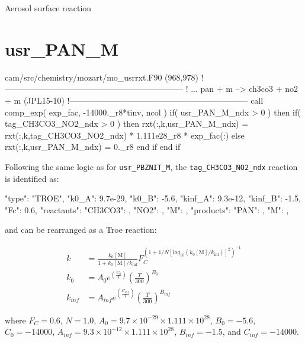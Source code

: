 \documentclass[titlepage]{article}
\begin{document}
Aerosol surface reaction


\section{usr\_PAN\_M}

\begin{blockcode}[commandchars=\\\{\}]
\color{gray}cam/src/chemistry/mozart/mo_usrrxt.F90 (968,978)
!-----------------------------------------------------------------
! ... pan + m --> ch3co3 + no2 + m (JPL15-10)
!-----------------------------------------------------------------
       call comp_exp( exp_fac, -14000._r8*tinv, ncol )
       if( usr_PAN_M_ndx > 0 ) then
          if( tag_CH3CO3_NO2_ndx > 0 ) then
             rxt(:,k,usr_PAN_M_ndx) = rxt(:,k,tag_CH3CO3_NO2_ndx) * 1.111e28_r8 * exp_fac(:)
          else
             rxt(:,k,usr_PAN_M_ndx) = 0._r8
          end if
       end if
\end{blockcode}

Following the same logic as for \verb>usr_PBZNIT_M>, the \verb>tag_CH3CO3_NO2_ndx> reaction is identified as:

\begin{blockcode}
         {
          "type": "TROE",
          "k0_A": 9.7e-29,
          "k0_B": -5.6,
          "kinf_A": 9.3e-12,
          "kinf_B": -1.5,
          "Fc": 0.6,
          "reactants": {
            "CH3CO3": { },
            "NO2": { },
            "M": { }
          },
          "products": {
            "PAN": { },
            "M": { }
          }
        },
\end{blockcode}

\noindent and can be rearranged as a Troe reaction:

\begin{equation}
\begin{split}
k & = \frac{k_0[\mbox{M}]}{1+k_0[\mbox{M}]/k_{\inf}}F_C^{(1+1/N[log_{10}(k_0[\mbox{M}]/k_{\inf})]^2)^{-1}} \\
k_0 & = A_0 e^{\left( \frac{C_0}{T} \right)} \left( \frac{T}{300} \right)^{B_0} \\
k_{inf} & = A_{inf} e^{\left( \frac{C_{inf}}{T} \right)} \left( \frac{T}{300} \right)^{B_{inf}}
\end{split}
\end{equation}

\noindent where $F_C = 0.6$, $N = 1.0$, $A_0 = 9.7 \times 10^{-29} \times 1.111 \times 10^{28}$, $B_0 = -5.6$, $C_0 = -14000$, $A_{inf} = 9.3 \times 10^{-12} \times 1.111 \times 10^{28}$, $B_{inf} = -1.5$, and $C_{inf} = -14000$.
\end{document}
